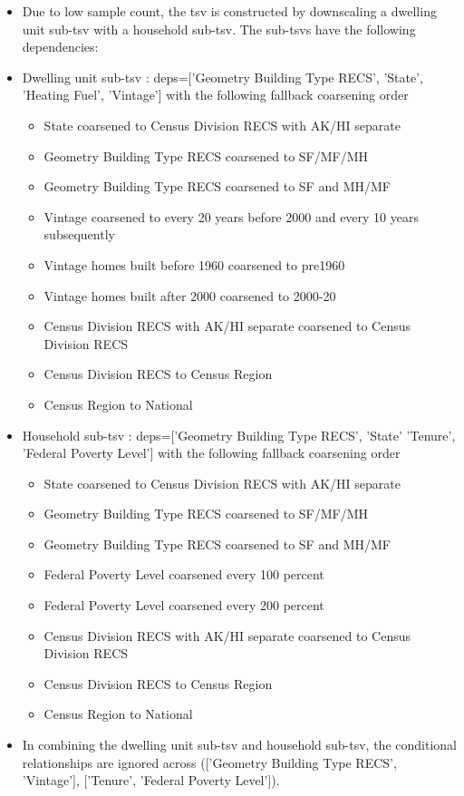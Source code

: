 \begin{itemize}
\item Due to low sample count, the tsv is constructed by downscaling a dwelling unit sub-tsv with a household sub-tsv. The sub-tsvs have the following dependencies:
\item Dwelling unit sub-tsv : deps=['Geometry Building Type RECS', 'State', 'Heating Fuel', 'Vintage'] with the following fallback coarsening order
  \begin{itemize}
  \item State coarsened to Census Division RECS with AK/HI separate
  \item Geometry Building Type RECS coarsened to SF/MF/MH
  \item Geometry Building Type RECS coarsened to SF and MH/MF
  \item Vintage coarsened to every 20 years before 2000 and every 10 years subsequently
  \item Vintage homes built before 1960 coarsened to pre1960
  \item Vintage homes built after 2000 coarsened to 2000-20
  \item Census Division RECS with AK/HI separate coarsened to Census Division RECS
  \item Census Division RECS to Census Region
  \item Census Region to National
  \end{itemize}
\item Household sub-tsv : deps=['Geometry Building Type RECS', 'State' 'Tenure', 'Federal Poverty Level'] with the following fallback coarsening order
  \begin{itemize}
  \item State coarsened to Census Division RECS with AK/HI separate
  \item Geometry Building Type RECS coarsened to SF/MF/MH
  \item Geometry Building Type RECS coarsened to SF and MH/MF
  \item Federal Poverty Level coarsened every 100 percent
  \item Federal Poverty Level coarsened every 200 percent
  \item Census Division RECS with AK/HI separate coarsened to Census Division RECS
  \item Census Division RECS to Census Region
  \item Census Region to National
  \end{itemize}
\item In combining the dwelling unit sub-tsv and household sub-tsv, the conditional relationships are ignored across (['Geometry Building Type RECS', 'Vintage'], ['Tenure', 'Federal Poverty Level']).
\end{itemize}
